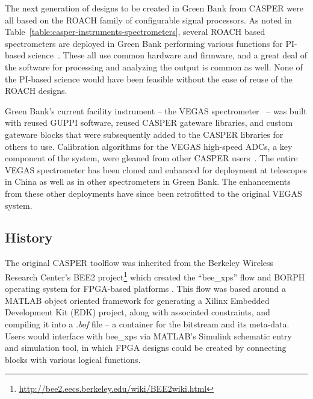 \documentclass{ws-jai}
\begin{document}
The next generation of designs to be created in Green Bank from CASPER
were all based on the ROACH family of configurable signal processors.
As noted in Table~\ref{table:casper-instruments-spectrometers}, several ROACH based spectrometers
are deployed in Green Bank performing various functions for PI-based
science~\citep[for example]{skynet}.  These all use common
hardware and firmware, and a great deal of the software for processing
and analyzing the output is common as well.  None of the PI-based
science would have been feasible without the ease of reuse of the
ROACH designs.

Green Bank's current facility instrument -- the VEGAS
spectrometer~\citep{chennamangalam2014gpu} -- was built with reused GUPPI
software, reused CASPER gateware libraries, and custom gateware
blocks that were subsequently added to the CASPER libraries for others
to use.  Calibration algorithms for the VEGAS high-speed ADCs, a key component of the system, were gleaned from other
CASPER users~\citep{adc5g}.
The entire VEGAS spectrometer has been cloned and enhanced for
deployment at telescopes in China as well
as in other spectrometers in Green Bank.  The enhancements from these
other deployments have since been retrofitted to the original VEGAS system.

%
%

\subsection{History}
The original CASPER toolflow was inherited from the Berkeley Wireless Research Center's BEE2 project\footnote{\url{http://bee2.eecs.berkeley.edu/wiki/BEE2wiki.html}} which created the ``bee\_xps'' flow and BORPH operating system for FPGA-based platforms \citep{borph1, borph2, borph-thesis}. This flow was based around a MATLAB object oriented framework for generating a Xilinx Embedded Development Kit (EDK) project, along with associated constraints, and compiling it into a \emph{.bof} file -- a container for the bitstream and its meta-data. Users would interface with bee\_xps via MATLAB's Simulink schematic entry and simulation tool, in which FPGA designs could be created by connecting blocks with various logical functions.
\end{document}
